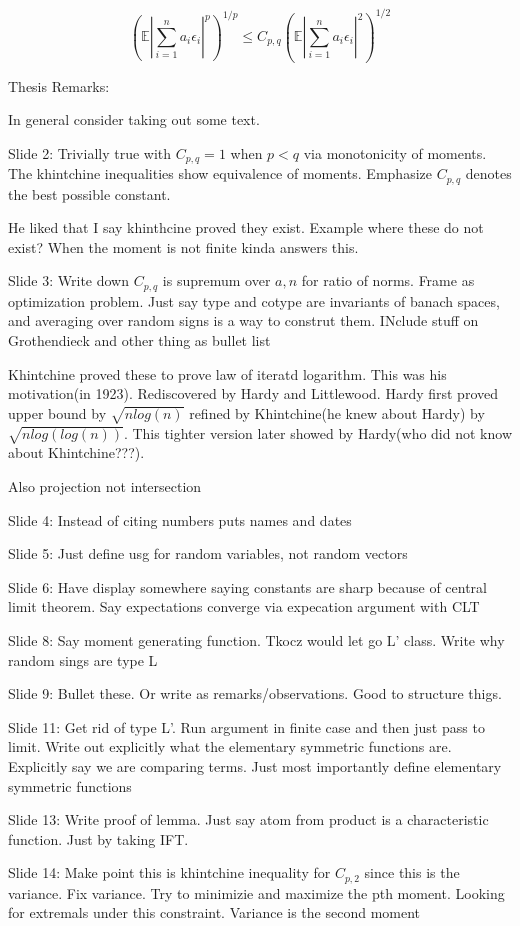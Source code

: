 \documentclass[11pt]{article}
\theoremstyle{remark}
\begin{document}
\[
	(\mathbb{E} |\sum_{i=1}^n a_i \epsilon_i|^p)^{1/p} \leq C_{p,q}(\mathbb{E} |\sum_{i=1}^n a_i \epsilon_i|^2)^{1/2}
\]

Thesis Remarks:

In general consider taking out some text.

Slide 2: Trivially true with $C_{p,q} = 1$ when $p < q$ via monotonicity of moments. The khintchine inequalities show equivalence of moments. Emphasize $C_{p,q}$ denotes the best possible constant.

He liked that I say khinthcine proved they exist. Example where these do not exist? When the moment is not finite kinda answers this.

Slide 3: Write down $C_{p,q}$ is supremum over $a,n$ for ratio of norms. Frame as optimization problem. Just say type and cotype are invariants of banach spaces, and averaging over random signs is a way to construt them. INclude stuff on Grothendieck and other thing as bullet list

Khintchine proved these to prove law of iteratd logarithm. This was his motivation(in 1923). Rediscovered by Hardy and Littlewood. Hardy first proved upper bound by $\sqrt{nlog(n)}$ refined by Khintchine(he knew about Hardy) by $\sqrt{nlog(log(n))}$. This tighter version later showed by Hardy(who did not know about Khintchine???).

Also projection not intersection

Slide 4: Instead of citing numbers puts names and dates

Slide 5: Just define usg for random variables, not random vectors

Slide 6: Have display somewhere saying constants are sharp because of central limit theorem. Say expectations converge via expecation argument with CLT

Slide 8: Say moment generating function. Tkocz would let go L' class. Write why random sings are type L

Slide 9: Bullet these. Or write as remarks/observations. Good to structure thigs.

Slide 11: Get rid of type L'. Run argument in finite case and then just pass to limit. Write out explicitly what the elementary symmetric functions are. Explicitly say we are comparing terms. Just most importantly define elementary symmetric functions

Slide 13: Write proof of lemma. Just say atom from product is a characteristic function. Just by taking IFT.

Slide 14: Make point this is khintchine inequality for $C_{p,2}$ since this is the variance. Fix variance. Try to minimizie and maximize the pth moment. Looking for extremals under this constraint. Variance is the second moment
\end{document}
